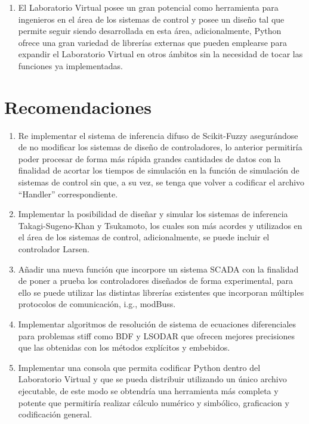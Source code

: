 \begin{enumerate}[leftmargin=15pt]
        \item El Laboratorio Virtual posee un gran potencial como herramienta para ingenieros en el área de los sistemas de control y posee un diseño tal que permite seguir siendo desarrollada en esta área, adicionalmente, Python ofrece una gran variedad de librerías externas que pueden emplearse para expandir el Laboratorio Virtual en otros ámbitos sin la necesidad de tocar las funciones ya implementadas.
    \end{enumerate}

\section{Recomendaciones}

\begin{enumerate}[leftmargin=15pt]
    \setlength\itemsep{10pt}    
    \item Re implementar el sistema de inferencia difuso de Scikit-Fuzzy asegurándose de no modificar los sistemas de diseño de controladores, lo anterior permitiría poder procesar de forma más rápida grandes cantidades de datos con la finalidad de acortar los tiempos de simulación en la función de simulación de sistemas de control sin que, a su vez, se tenga que volver a codificar el archivo \enquote{Handler} correspondiente.
    
    \item Implementar la posibilidad de diseñar y simular los sistemas de inferencia Takagi-Sugeno-Khan y Tsukamoto, los cuales son más acordes y utilizados en el área de los sistemas de control, adicionalmente, se puede incluir el controlador Larsen.
    
    \item Añadir una nueva función que incorpore un sistema SCADA con la finalidad de poner a prueba los controladores diseñados de forma experimental, para ello se puede utilizar las distintas librerías existentes que incorporan múltiples protocolos de comunicación, i.g., modBuss.
    
    \item Implementar algoritmos de resolución de sistema de ecuaciones diferenciales para problemas stiff como BDF y LSODAR que ofrecen mejores precisiones que las obtenidas con los métodos explícitos y embebidos.
    
    \item Implementar una consola que permita codificar Python dentro del Laboratorio Virtual y que se pueda distribuir utilizando un único archivo ejecutable, de este modo se obtendría una herramienta más completa y potente que permitiría realizar cálculo numérico y simbólico, graficacion y codificación general.  

\end{enumerate}